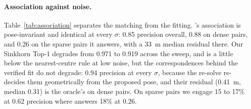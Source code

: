 \begin{table}[t]
  \centering\small
  \caption{\textbf{Association accuracy against localization noise, \vxreal test} (1,696 ego-CAV pairs sharing at least one object, one noise seed). Top-1 over ego objects that have a counterpart; precision / recall of the correspondences each method fits; coverage is the fraction of pairs the method answers. Residual: mean centre error of the corrected CAV boxes, in metres.}
  \label{tab:association}
\end{table}

\paragraph{Association against noise.}
Table~\ref{tab:association} separates the matching from the fitting. \freealign's association is pose-invariant and identical at every $\sigma$: 0.85 precision overall, 0.88 on dense pairs, and 0.26 on the sparse pairs it answers, with a \SI{33}{m} median residual there. Our Sinkhorn Top-1 degrades from 0.971 to 0.919 across the sweep, and is a little below the nearest-centre rule at low noise, but the correspondences behind the verified fit do not degrade: 0.94 precision at every $\sigma$, because the re-solve re-decides them geometrically from the proposed pose, and their residual (\SI{0.41}{m}, median 0.31) is the oracle's on dense pairs. On sparse pairs we engage 15 to 17\% at 0.62 precision where \freealign answers 18\% at 0.26.

